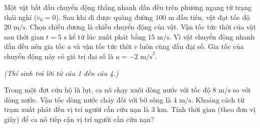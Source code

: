 \begin{ex}
	Một vật bắt đầu chuyển động thẳng nhanh dần đều trên phương ngang từ trạng thái nghỉ ($v_0 = 0$). Sau khi đi được quãng đường $100\text{ m}$ đầu tiên, vật đạt tốc độ $20\text{ m/s}$. Chọn chiều dương là chiều chuyển động của vật.
	{Vận tốc tức thời của vật sau thời gian $t = 5\text{ s}$ kể từ lúc xuất phát bằng $15\text{ m/s}$.}
	{\True Vì vật chuyển động nhanh dần đều nên gia tốc $a$ và vận tốc tức thời $v$ luôn cùng dấu đại số.}
	{Gia tốc của chuyển động này có giá trị đại số là $a = -2\text{ m/s}^2$.}
\end{ex}

\vspace{0.15cm}
\begin{flushleft}
	{\color{blue!50!green}}
	\textit{\small (Thí sinh trả lời từ câu 1 đến câu 4.)}
\end{flushleft}
\setcounter{ex}{0}
\setcounter{bt}{0}

\begin{ex}
	Trong một đợt cứu hộ lũ lụt, ca nô chạy xuôi dòng nước với tốc độ $8\text{ m/s}$ so với dòng nước. Vận tốc dòng nước chảy đối với bờ sông là $4\text{ m/s}$. Khoảng cách từ trạm xuất phát đến vị trí người cần cứu nạn là $3\text{ km}$. Tính thời gian (theo đơn vị giây) để ca nô tiếp cận vị trí người cần cứu nạn?

	\par{}
\end{ex}

